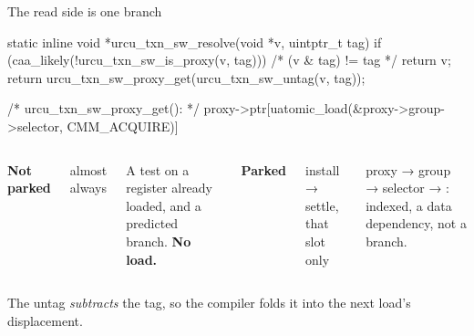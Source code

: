 \documentclass[aspectratio=169, 10pt, t, xcolor=table]{beamer}
\newcommand{\aside}[1]{{\footnotesize\color{muted}#1\par}}
\begin{document}
\begin{frame}[fragile]{The read side is one branch}
\begin{codeblocksmall}
static inline void *urcu_txn_sw_resolve(void *v, uintptr_t tag)
{
    if (caa_likely(!urcu_txn_sw_is_proxy(v, tag)))  /* (v & tag) != tag */
        return v;
    return urcu_txn_sw_proxy_get(urcu_txn_sw_untag(v, tag));
}

/* urcu_txn_sw_proxy_get(): */
    proxy->ptr[uatomic_load(&proxy->group->selector, CMM_ACQUIRE)]
\end{codeblocksmall}
\vspace{3mm}
\begin{columns}[T, onlytextwidth]
  {\bfseries\color{accent}Not parked}\enspace
  {\small\color{muted}almost always\par}
  \vspace{1mm}
  {\small A test on a register already loaded, and a predicted branch.
  \textbf{No load.}\par}
  {\bfseries Parked}\enspace
  {\small\color{muted}install → settle, that slot only\par}
  \vspace{1mm}
  {\small proxy → group → selector → : indexed, a data
  dependency, not a branch.\par}
\end{columns}
\vspace{5mm}
\aside{The untag \emph{subtracts} the tag, so the compiler folds it into the
next load's displacement.}
\end{frame}
\end{document}
